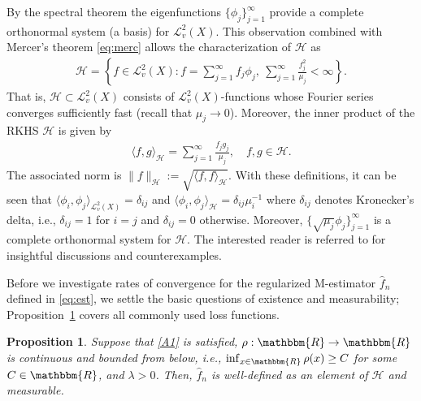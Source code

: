 \documentclass[11pt]{article}
\newtheorem{prop}{Proposition}
\theoremstyle{definition}
\theoremstyle{remark}
\begin{document}
By the spectral theorem \citep[see, e.g.,][Theorem 4.2.4]{Hsing:2015} the eigenfunctions $\{\phi_j\}_{j=1}^{\infty}$ provide a complete orthonormal system (a basis) for $\mathcal{L}^2_v(X)$. This observation combined with Mercer's theorem \eqref{eq:merc} allows the characterization of $\mathcal{H}$ as
\begin{align}
\label{eq:rkhs}
\mathcal{H} = \left\{f \in \mathcal{L}^2_v(X): f = \sum_{j=1}^{\infty} f_j \phi_j , \ \sum_{j=1}^\infty \frac{f_j^2}{\mu_j} < \infty \right\}.
\end{align}
That is, $\mathcal{H} \subset \mathcal{L}^2_v(X)$ consists  of $\mathcal{L}^2_v(X)$-functions whose Fourier series converges sufficiently fast (recall that $\mu_j \to 0$). Moreover, the inner product of the RKHS $\mathcal{H}$ is given by
\begin{align*}
\langle f, g \rangle_{\mathcal{H}} = \sum_{j=1}^{\infty} \frac{f_j g_j}{\mu_j}, \quad f,g \in \mathcal{H}.
\end{align*}
The associated norm is $\|f\|_{\mathcal{H}} := \sqrt{\langle f, f \rangle_{\mathcal{H}}}$. With these definitions, it can be seen that $\langle \phi_i, \phi_j \rangle_{\mathcal{L}^2_v(X)} = \delta_{ij}$ and $\langle \phi_i, \phi_j \rangle_{\mathcal{H}} = \delta_{ij} \mu_i^{-1}$ where $\delta_{ij}$ denotes Kronecker's delta, i.e., $\delta_{ij} = 1$ for $i = j$ and $\delta_{ij} =0$ otherwise. Moreover, $\{\sqrt{\mu_j}\phi_j\}_{j=1}^{\infty}$ is a complete orthonormal system for $\mathcal{H}$. The interested reader is referred to \citep{St:2012} for insightful discussions and counterexamples.

Before we investigate rates of convergence for the regularized M-estimator $\widehat{f}_n$ defined in \eqref{eq:est}, we settle the basic questions of existence and measurability; Proposition~\ref{prop:1} covers all commonly used loss functions.

\begin{prop}
\label{prop:1}
Suppose that \ref{A1} is satisfied, $\rho: \mathbbm{R} \to \mathbbm{R}$ is continuous and bounded from below, i.e., $\inf_{x \in \mathbbm{R}} \rho(x) \geq C$ for some $C \in \mathbbm{R}$, and $\lambda>0$. Then, $\widehat{f}_n$ is well-defined as an element of $\mathcal{H}$ and measurable. 
\end{prop}
\end{document}
